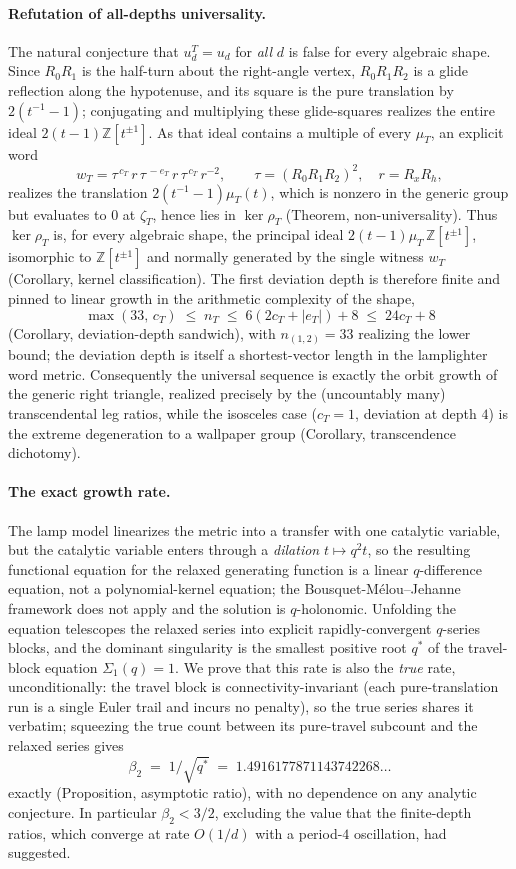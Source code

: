 \documentclass[11pt]{article}
\theoremstyle{plain}
\theoremstyle{definition}
\theoremstyle{remark}
\newcommand{\Z}{\mathbb{Z}}
\begin{document}
\paragraph{Refutation of all-depths universality.}
The natural conjecture that $u_d^T=u_d$ for \emph{all} $d$ is false for
every algebraic shape. Since $R_0R_1$ is the half-turn about the
right-angle vertex, $R_0R_1R_2$ is a glide reflection along the
hypotenuse, and its square is the pure translation by $2(t^{-1}-1)$;
conjugating and multiplying these glide-squares realizes the entire
ideal $2(t-1)\Z[t^{\pm1}]$. As that ideal contains a multiple of every
$\mu_T$, an explicit word
\[
  w_T=\tau^{\,c_T}\,r\,\tau^{\,-e_T}\,r\,\tau^{\,c_T}\,r^{-2},
  \qquad \tau=(R_0R_1R_2)^2,\quad r=R_x R_h,
\]
realizes the translation $2(t^{-1}-1)\mu_T(t)$, which is nonzero in the
generic group but evaluates to $0$ at $\zeta_T$, hence lies in
$\ker\rho_T$ (Theorem, non-universality). Thus $\ker\rho_T$ is, for
every algebraic shape, the principal ideal $2(t-1)\mu_T\,\Z[t^{\pm1}]$,
isomorphic to $\Z[t^{\pm1}]$ and normally generated by the single
witness $w_T$ (Corollary, kernel classification). The first deviation
depth is therefore finite and pinned to linear growth in the arithmetic
complexity of the shape,
\[
  \max(33,\,c_T)\;\le\;n_T\;\le\;6(2c_T+|e_T|)+8\;\le\;24c_T+8
\]
(Corollary, deviation-depth sandwich), with $n_{(1,2)}=33$ realizing
the lower bound; the deviation depth is itself a shortest-vector length
in the lamplighter word metric. Consequently the universal sequence is
exactly the orbit growth of the generic right triangle, realized
precisely by the (uncountably many) transcendental leg ratios, while
the isosceles case ($c_T=1$, deviation at depth $4$) is the extreme
degeneration to a wallpaper group (Corollary, transcendence dichotomy).

\paragraph{The exact growth rate.}
The lamp model linearizes the metric into a transfer with one catalytic
variable, but the catalytic variable enters through a \emph{dilation}
$t\mapsto q^2 t$, so the resulting functional equation for the relaxed
generating function is a linear $q$-difference equation, not a
polynomial-kernel equation; the Bousquet-M\'elou--Jehanne framework does
not apply and the solution is $q$-holonomic. Unfolding the equation
telescopes the relaxed series into explicit rapidly-convergent
$q$-series blocks, and the dominant singularity is the smallest positive
root $q^*$ of the travel-block equation $\Sigma_1(q)=1$. We prove that
this rate is also the \emph{true} rate, unconditionally: the travel
block is connectivity-invariant (each pure-translation run is a single
Euler trail and incurs no penalty), so the true series shares it
verbatim; squeezing the true count between its pure-travel subcount and
the relaxed series gives
\[
  \beta_2 \;=\; 1/\sqrt{q^*}\;=\;1.4916177871143742268\ldots
\]
exactly (Proposition, asymptotic ratio), with no dependence on any
analytic conjecture. In particular $\beta_2<3/2$, excluding the value
that the finite-depth ratios, which converge at rate $O(1/d)$ with a
period-$4$ oscillation, had suggested.
\end{document}
